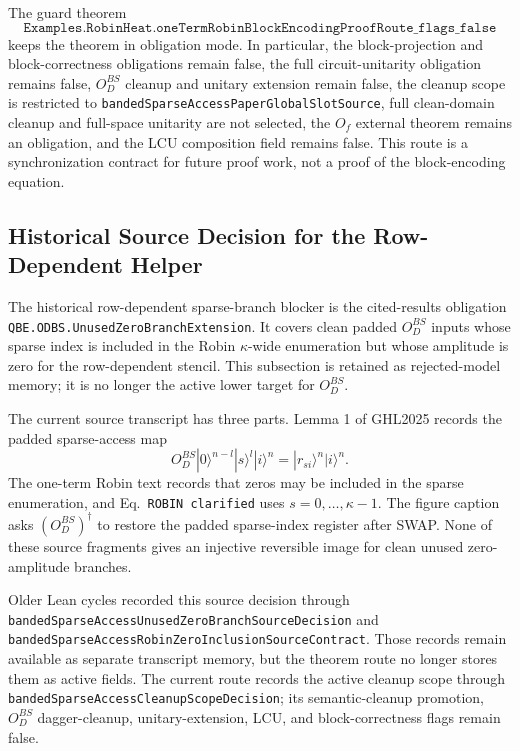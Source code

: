 The guard theorem
\[
  \texttt{Examples.RobinHeat.oneTermRobinBlockEncodingProofRoute\_flags\_false}
\]
keeps the theorem in obligation mode.  In particular, the block-projection and
block-correctness obligations remain false, the full circuit-unitarity
obligation remains false, \(O_D^{BS}\) cleanup and unitary extension remain
false, the cleanup scope is restricted to
\texttt{bandedSparseAccessPaperGlobalSlotSource}, full clean-domain cleanup
and full-space unitarity are not selected, the \(O_f\) external theorem remains
an obligation, and the LCU composition field remains false.  This route is a
synchronization contract for future proof work, not a proof of the
block-encoding equation.

\subsection{Historical Source Decision for the Row-Dependent Helper}

The historical row-dependent sparse-branch blocker is the cited-results obligation
\texttt{QBE.ODBS.UnusedZeroBranchExtension}.  It covers clean padded
\(O_D^{BS}\) inputs whose sparse index is included in the Robin
\(\kappa\)-wide enumeration but whose amplitude is zero for the row-dependent
stencil.  This subsection is retained as rejected-model memory; it is no
longer the active lower target for \(O_D^{BS}\).

The current source transcript has three parts.  Lemma 1 of GHL2025 records the
padded sparse-access map
\[
  O_D^{BS}|0\rangle^{n-l}|s\rangle^l|i\rangle^n
  =
  |r_{si}\rangle^n|i\rangle^n.
\]
The one-term Robin text records that zeros may be included in the sparse
enumeration, and Eq.~\texttt{ROBIN clarified} uses
\(s=0,\ldots,\kappa-1\).  The figure caption asks
\((O_D^{BS})^\dagger\) to restore the padded sparse-index register after SWAP.
None of these source fragments gives an injective reversible image for clean
unused zero-amplitude branches.

Older Lean cycles recorded this source decision through
\texttt{bandedSparseAccessUnusedZeroBranchSourceDecision} and
\texttt{bandedSparseAccessRobinZeroInclusionSourceContract}.  Those records
remain available as separate transcript memory, but the theorem route no
longer stores them as active fields.  The current route records the active
cleanup scope through \texttt{bandedSparseAccessCleanupScopeDecision}; its
semantic-cleanup promotion, \(O_D^{BS}\) dagger-cleanup, unitary-extension,
LCU, and block-correctness flags remain false.

